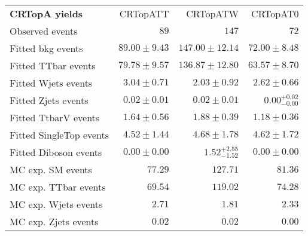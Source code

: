 

\begin{table}
\begin{center}
\setlength{\tabcolsep}{0.0pc}
{\small
\begin{tabular*}{\textwidth}{@{\extracolsep{\fill}}lrrr}
\noalign{\smallskip}\hline\noalign{\smallskip}
{\bf CRTopA yields}           & CRTopATT            & CRTopATW            & CRTopAT0              \\[-0.05cm]
\noalign{\smallskip}\hline\noalign{\smallskip}
Observed events          & $89$              & $147$              & $72$                    \\
\noalign{\smallskip}\hline\noalign{\smallskip}
Fitted bkg events         & $89.00 \pm 9.43$          & $147.00 \pm 12.14$          & $72.00 \pm 8.48$              \\
\noalign{\smallskip}\hline\noalign{\smallskip}
        Fitted TTbar events         & $79.78 \pm 9.57$          & $136.87 \pm 12.80$          & $63.57 \pm 8.70$              \\
        Fitted Wjets events         & $3.04 \pm 0.71$          & $2.03 \pm 0.92$          & $2.62 \pm 0.66$              \\
        Fitted Zjets events         & $0.02 \pm 0.01$          & $0.02 \pm 0.01$          & $0.00_{-0.00}^{+0.02}$              \\
        Fitted TtbarV events         & $1.64 \pm 0.56$          & $1.88 \pm 0.39$          & $1.18 \pm 0.36$              \\
        Fitted SingleTop events         & $4.52 \pm 1.44$          & $4.68 \pm 1.78$          & $4.62 \pm 1.72$              \\
        Fitted Diboson events         & $0.00 \pm 0.00$          & $1.52_{-1.52}^{+2.55}$          & $0.00 \pm 0.00$              \\
 \noalign{\smallskip}\hline\noalign{\smallskip}
MC exp. SM events              & $77.29$          & $127.71$          & $81.36$              \\
\noalign{\smallskip}\hline\noalign{\smallskip}
        MC exp. TTbar events         & $69.54$          & $119.02$          & $74.28$              \\
        MC exp. Wjets events         & $2.71$          & $1.81$          & $2.33$              \\
        MC exp. Zjets events         & $0.02$          & $0.02$          & $0.00$              \\

\end{tabular*}}
\end{center}
\end{table}
